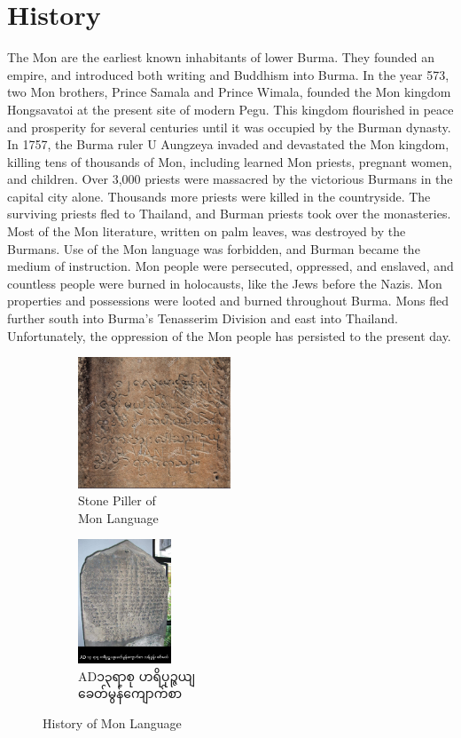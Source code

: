 \documentclass[conference]{IEEEtran}
\begin{document}
\section{History}
The Mon are the earliest known inhabitants of lower Burma. They founded an empire, and introduced both writing and Buddhism into Burma. In the year 573, two Mon brothers, Prince Samala and Prince Wimala, founded the Mon kingdom Hongsavatoi at the present site of modern Pegu. This kingdom flourished in peace and prosperity for several centuries until it was occupied by the Burman dynasty. In 1757, the Burma ruler U Aungzeya invaded and devastated the Mon kingdom, killing tens of thousands of Mon, including learned Mon priests, pregnant women, and children. Over 3,000 priests were massacred by the victorious Burmans in the capital city alone. Thousands more priests were killed in the countryside. The surviving priests fled to Thailand, and Burman priests took over the monasteries. Most of the Mon literature, written on palm leaves, was destroyed by the Burmans. Use of the Mon language was forbidden, and Burman became the medium of instruction. Mon people were persecuted, oppressed, and enslaved, and countless people were burned in holocausts, like the Jews before the Nazis. Mon properties and possessions were looted and burned throughout Burma. Mons fled further south into Burma's Tenasserim Division and east into Thailand. Unfortunately, the oppression of the Mon people has persisted to the present day.\cite{b2}

\begin{figure}[h!]
  \centering
  \begin{subfigure}[b]{0.4\linewidth}
    \includegraphics[width=\linewidth, height=3.9cm]{./fig/his1.jpg}
    \caption{Stone Piller of \\Mon Language}
  \end{subfigure}
  \begin{subfigure}[b]{0.4\linewidth}
    \includegraphics[width=\linewidth, height=3.7cm]{./fig/his3.jpg}
    \caption{{\padauktext AD၁၃ရာစု ဟရိပုဉ္ဇယျ\\ခေတ်မွန်ကျောက်စာ}}
  \end{subfigure}
  \caption{History of Mon Language}
  \label{fig:coffee}
\end{figure}
\end{document}

